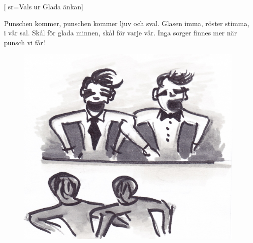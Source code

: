 

[				%
	sr={Vals ur Glada änkan}]						%
	

\beginverse*						%
Punschen kommer,
punschen kommer
ljuv och sval.
Glasen imma,
röster stimma,
i vår sal.
Skål för glada minnen,
skål för varje vår.
Inga sorger finnes mer när punsch vi får!
\endverse							%

\endsong							%

\begin{figure}[!b]
\begin{center}
\includegraphics[scale=.5]{../bilder/punschenkommer.jpg} 
\end{center}
\end{figure}